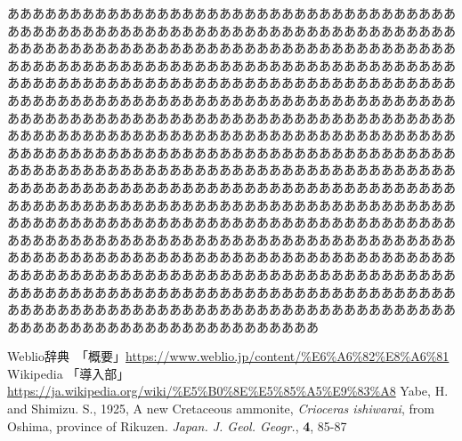 \documentclass{jsarticle}
\begin{document}
\begin{multicols}{2}
あああああああああああああああああああああああああああああああああああああああああああああああああああああああああああああああああああああああああああああああああああああああああああああああああああああああああああああああああああああああああああああああああああああああああああああああああああああああああああああああああああああああああああああああああああああああああああああああああああああああああああああああああああああああああああああああああああああああああああああああああああああああああああああああああああああああああああああああああああああああああああああああああああああああああああああああああああああああああああああああああああああああああああああああああああああああああああああああああああああああああああああああああああああああああああああああああああああああああああああああああああああああああああああああああああああああああああああああああああああああああああああああああああああああああああああああああああああああああああああああああああああああああああああああああああああああああああああああああああああああああああああああああああああああああああああああああああああああああああああああああああああああああああああああああああああああああああああああああああああああああああああああああああああああああああああああああああああああああああああああああああああああああああああああああああああああああああああああああ

       
      



      \begin{thebibliography}{99}
          Weblio辞典　「概要」\url{https://www.weblio.jp/content/%E6%A6%82%E8%A6%81}
          Wikipedia 「導入部」\url{https://ja.wikipedia.org/wiki/%E5%B0%8E%E5%85%A5%E9%83%A8}
          Yabe, H. and Shimizu. S., 1925, A new Cretaceous ammonite, \textit{ Crioceras ishiwarai}, from Oshima, province of Rikuzen.
         \textit{Japan. J. Geol. Geogr.}, \textbf{4}, 85-87
       \end{thebibliography}
      \newpage
   \end{multicols}
\end{document}
